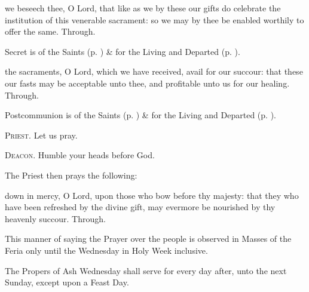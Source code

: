 \secret\label{AshWednesdayMassSecret}
 we beseech thee, O Lord, that like as we by these our gifts do celebrate the institution of this venerable sacrament: so we may by thee be enabled worthily to offer the same. Through.
\begin{rubric}
     Secret is of the Saints (p. \pageref{SPSaints}) \&  for the Living and Departed (p. \pageref{SPLivingDeparted}).
\end{rubric}
\postcommunion\label{AshWednesdayMassPostcommunion}
 the sacraments, O Lord, which we have received, avail for our succour: that these our fasts may be acceptable unto thee, and profitable unto us for our healing. Through.
\begin{rubric}
     Postcommunion is of the Saints (p. \pageref{SPSaints}) \&  for the Living and Departed (p. \pageref{SPLivingDeparted}).
\end{rubric}

\textsc{Priest.} Let us pray.\par
\textsc{Deacon.} Humble your heads before God.\par
\begin{rubric}
    The Priest then prays the following:
\end{rubric}
 down in mercy, O Lord, upon those who bow before thy majesty: that they who have been refreshed by the divine gift, may evermore be nourished by thy heavenly succour. Through.
\begin{rubric}
This manner of saying the Prayer over the people is observed in Masses of the Feria only until the Wednesday in Holy Week inclusive.
\end{rubric}
\begin{rubric}
    The Propers of Ash Wednesday shall serve for every day after, unto the next Sunday, except upon a Feast Day.
\end{rubric}

